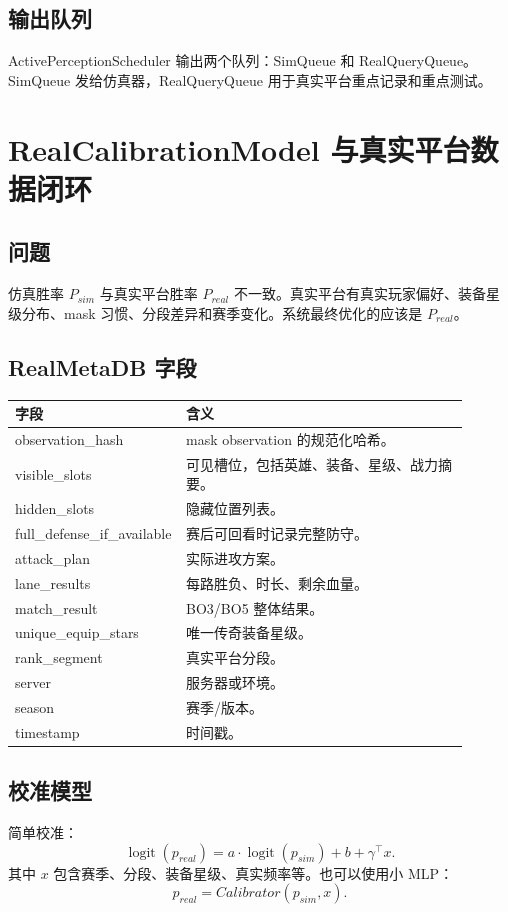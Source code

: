 \documentclass[UTF8,12pt,openany]{ctexbook}
\newcommand{\logit}{\operatorname{logit}}
\begin{document}
\section{输出队列}
ActivePerceptionScheduler 输出两个队列：SimQueue 和 RealQueryQueue。SimQueue 发给仿真器，RealQueryQueue 用于真实平台重点记录和重点测试。


\chapter{RealCalibrationModel 与真实平台数据闭环}

\section{问题}
仿真胜率 $P_{sim}$ 与真实平台胜率 $P_{real}$ 不一致。真实平台有真实玩家偏好、装备星级分布、mask 习惯、分段差异和赛季变化。系统最终优化的应该是 $P_{real}$。

\section{RealMetaDB 字段}
\begin{longtable}{p{0.28\linewidth}p{0.62\linewidth}}
\toprule
字段 & 含义 \\
\midrule
observation\_hash & mask observation 的规范化哈希。\\
visible\_slots & 可见槽位，包括英雄、装备、星级、战力摘要。\\
hidden\_slots & 隐藏位置列表。\\
full\_defense\_if\_available & 赛后可回看时记录完整防守。\\
attack\_plan & 实际进攻方案。\\
lane\_results & 每路胜负、时长、剩余血量。\\
match\_result & BO3/BO5 整体结果。\\
unique\_equip\_stars & 唯一传奇装备星级。\\
rank\_segment & 真实平台分段。\\
server & 服务器或环境。\\
season & 赛季/版本。\\
timestamp & 时间戳。\\
\bottomrule
\end{longtable}

\section{校准模型}
简单校准：
\begin{equation}
\logit(p_{real})=a\cdot\logit(p_{sim})+b+\gamma^\top x.
\end{equation}
其中 $x$ 包含赛季、分段、装备星级、真实频率等。也可以使用小 MLP：
\begin{equation}
p_{real}=Calibrator(p_{sim},x).
\end{equation}
\end{document}
